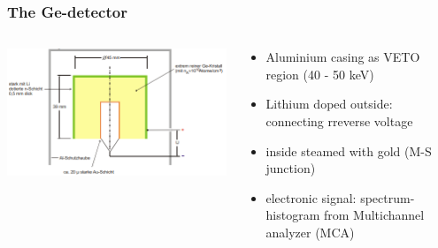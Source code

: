 \documentclass[aspectratio=1610, 12pt]{beamer}
\begin{document}
\begin{frame}\frametitle{The Ge-detector}
  \begin{columns}
    \begin{column}[c]{0.48\textwidth}
      \includegraphics[width=\textwidth]{plots/ge.png}
    \end{column}
    \begin{column}[c]{0.48\textwidth}
      \begin{itemize}
        \item Aluminium casing as VETO region (40 - 50 keV)
        \item Lithium doped outside: connecting rreverse voltage
        \item inside steamed with gold (M-S junction)
        \item electronic signal: spectrum-histogram from Multichannel analyzer (MCA)
      \end{itemize}
    \end{column}
  \end{columns}
\end{frame}
\end{document}
